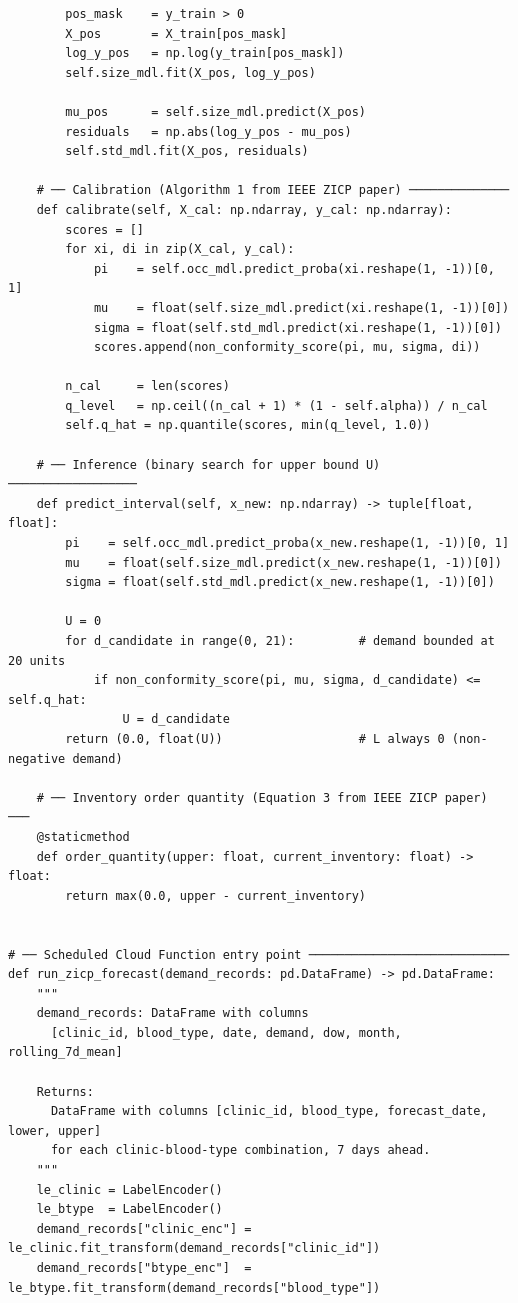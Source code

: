 \documentclass[12pt,a4paper]{article}
\begin{document}
\begin{lstlisting}
        pos_mask    = y_train > 0
        X_pos       = X_train[pos_mask]
        log_y_pos   = np.log(y_train[pos_mask])
        self.size_mdl.fit(X_pos, log_y_pos)

        mu_pos      = self.size_mdl.predict(X_pos)
        residuals   = np.abs(log_y_pos - mu_pos)
        self.std_mdl.fit(X_pos, residuals)

    # ── Calibration (Algorithm 1 from IEEE ZICP paper) ──────────────
    def calibrate(self, X_cal: np.ndarray, y_cal: np.ndarray):
        scores = []
        for xi, di in zip(X_cal, y_cal):
            pi    = self.occ_mdl.predict_proba(xi.reshape(1, -1))[0, 1]
            mu    = float(self.size_mdl.predict(xi.reshape(1, -1))[0])
            sigma = float(self.std_mdl.predict(xi.reshape(1, -1))[0])
            scores.append(non_conformity_score(pi, mu, sigma, di))

        n_cal     = len(scores)
        q_level   = np.ceil((n_cal + 1) * (1 - self.alpha)) / n_cal
        self.q_hat = np.quantile(scores, min(q_level, 1.0))

    # ── Inference (binary search for upper bound U) ──────────────────
    def predict_interval(self, x_new: np.ndarray) -> tuple[float, float]:
        pi    = self.occ_mdl.predict_proba(x_new.reshape(1, -1))[0, 1]
        mu    = float(self.size_mdl.predict(x_new.reshape(1, -1))[0])
        sigma = float(self.std_mdl.predict(x_new.reshape(1, -1))[0])

        U = 0
        for d_candidate in range(0, 21):         # demand bounded at 20 units
            if non_conformity_score(pi, mu, sigma, d_candidate) <= self.q_hat:
                U = d_candidate
        return (0.0, float(U))                   # L always 0 (non-negative demand)

    # ── Inventory order quantity (Equation 3 from IEEE ZICP paper) ───
    @staticmethod
    def order_quantity(upper: float, current_inventory: float) -> float:
        return max(0.0, upper - current_inventory)


# ── Scheduled Cloud Function entry point ────────────────────────────
def run_zicp_forecast(demand_records: pd.DataFrame) -> pd.DataFrame:
    """
    demand_records: DataFrame with columns
      [clinic_id, blood_type, date, demand, dow, month, rolling_7d_mean]

    Returns:
      DataFrame with columns [clinic_id, blood_type, forecast_date, lower, upper]
      for each clinic-blood-type combination, 7 days ahead.
    """
    le_clinic = LabelEncoder()
    le_btype  = LabelEncoder()
    demand_records["clinic_enc"] = le_clinic.fit_transform(demand_records["clinic_id"])
    demand_records["btype_enc"]  = le_btype.fit_transform(demand_records["blood_type"])


\end{lstlisting}
\end{document}
